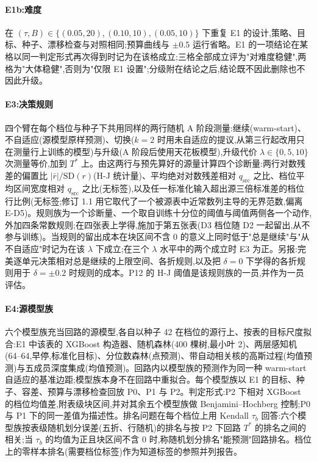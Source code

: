 \documentclass[11pt,a4paper]{ctexart}
\begin{document}
\paragraph{E1b:难度} 在 $(\tau, B) \in \{(0.05, 20), (0.10, 10), (0.05, 10)\}$ 下重复 E1 的设计,策略、目标、种子、漂移检查与对照相同;预算曲线与 $\pm 0.5$ 运行省略。E1 的一项结论在某格以同一判定形式再次得到时记为在该格成立;三格全部成立评为"对难度稳健",两格为"大体稳健",否则为"仅限 E1 设置";分级附在结论之后,结论既不因此删除也不因此升级。

\paragraph{E3:决策规则} 四个臂在每个档位与种子下共用同样的两行随机 A 阶段测量:继续(warm-start)、不自适应(源模型原样预测)、切换($k = 2$ 时用未自适应的提议,从第三行起改用只在测量行上训练的模型)与升级(A 阶段后使用天花板模型),升级代价 $\lambda \in \{0, 5, 10\}$ 次测量等价,加到 $T^{*}$ 上。由这两行与预先算好的源量计算四个诊断量:两行对数残差的偏置比 $|\bar r| / \mathrm{SD}(r)$(H-J 统计量)、平均绝对对数残差相对 $q_{\mathrm{src}}$ 之比、档位平均区间宽度相对 $q_{\mathrm{src}}$ 之比(无标签),以及任一标准化输入超出源三倍标准差的档位行比例(无标签;修订 1.1 用它取代了一个被源表中近常数列主导的无界范数,偏离 E-D5)。规则族为一个诊断量、一个取自训练十分位的阈值与阈值两侧各一个动作,外加四条常数规则;在四张表上学得,施加于第五张表(D3 档位随 D2 一起留出,从不参与训练)。当规则的留出成本在块区间不含 0 的意义上同时低于"总是继续"与"从不自适应"时记为在该 $\lambda$ 下成立;在三个 $\lambda$ 水平中的两个成立时 E3 为正。另报:完美逐单元决策相对总是继续的上限空间、各折规则,以及把 $\delta = 0$ 下学得的各折规则用于 $\delta = \pm 0.2$ 时规则的成本。P12 的 H-J 阈值是该规则族的一员,并作为一员评估。

\paragraph{E4:源模型族} 六个模型族充当回路的源模型,各自以种子 42 在档位的源行上、按表的目标尺度拟合:E1 中该表的 XGBoost 构造器、随机森林(400 棵树,最小叶 2)、两层感知机(64--64,早停,标准化目标)、分位数森林(点预测)、带自动相关核的高斯过程(均值预测)与五成员深度集成(均值预测)。回路内以模型族的预测作为同一种 warm-start 自适应的基准边距;模型族本身不在回路中重拟合。每个模型族以 E1 的目标、种子、容差、预算与漂移检查回放 P0、P1 与 P2。判定形式:P2 下相对 XGBoost 的档位均值差,附表级块区间,并对其余五个模型族做 Benjamini--Hochberg 控制;P0 与 P1 下的同一差值为描述性。排名问题在每个档位上用 Kendall $\tau_b$ 回答:六个模型族按表级随机划分误差(五折、行随机)的排名与按 P2 下回路 $T^{*}$ 的排名之间的相关;当 $\tau_b$ 的均值为正且块区间不含 0 时,称随机划分排名"能预测"回路排名。档位上的零样本排名(需要档位标签)作为知道标签的参照并列报告。
\end{document}
